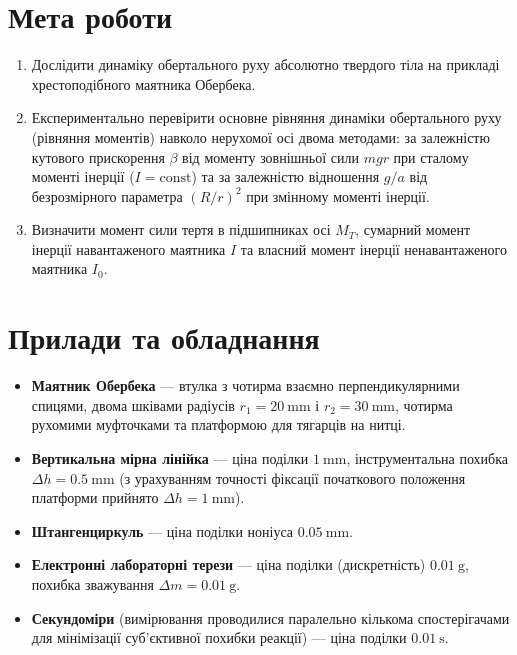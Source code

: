 \documentclass[ukrainian]{ucaphyslab}
\begin{document}
\maketitlepage

\section{Мета роботи}
\begin{enumerate}
  \item Дослідити динаміку обертального руху абсолютно твердого тіла на прикладі хрестоподібного маятника Обербека.
  \item Експериментально перевірити основне рівняння динаміки обертального руху (рівняння моментів) навколо нерухомої осі двома методами: за залежністю кутового прискорення $\beta$ від моменту зовнішньої сили $mgr$ при сталому моменті інерції ($I = \text{const}$) та за залежністю відношення $g/a$ від безрозмірного параметра $(R/r)^2$ при змінному моменті інерції.
  \item Визначити момент сили тертя в підшипниках осі $M_T$, сумарний момент інерції навантаженого маятника $I$ та власний момент інерції ненавантаженого маятника $I_0$.
\end{enumerate}

\section{Прилади та обладнання}
\begin{itemize}
  \item \textbf{Маятник Обербека} — втулка з чотирма взаємно перпендикулярними спицями, двома шківами радіусів $r_1 = \SI{20}{\milli\meter}$ і $r_2 = \SI{30}{\milli\meter}$, чотирма рухомими муфточками та платформою для тягарців на нитці.
  \item \textbf{Вертикальна мірна лінійка} — ціна поділки $\SI{1}{\milli\meter}$, інструментальна похибка $\Delta h = \SI{0.5}{\milli\meter}$ (з урахуванням точності фіксації початкового положення платформи прийнято $\Delta h = \SI{1}{\milli\meter}$).
  \item \textbf{Штангенциркуль} — ціна поділки ноніуса $\SI{0.05}{\milli\meter}$.
  \item \textbf{Електронні лабораторні терези} — ціна поділки (дискретність) $\SI{0.01}{\gram}$, похибка зважування $\Delta m = \SI{0.01}{\gram}$.
  \item \textbf{Секундоміри} (вимірювання проводилися паралельно кількома спостерігачами для мінімізації суб'єктивної похибки реакції) — ціна поділки $\SI{0.01}{\second}$.
\end{itemize}
\end{document}
